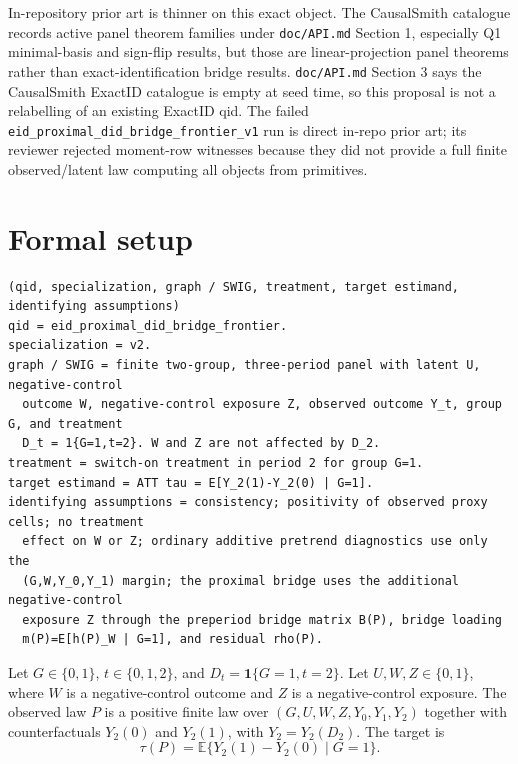 \documentclass[11pt]{article}
\newcommand{\E}{\mathbb{E}}
\newcommand{\one}{\mathbf{1}}
\theoremstyle{definition}
\theoremstyle{plain}
\theoremstyle{remark}
\begin{document}
In-repository prior art is thinner on this exact object. The CausalSmith catalogue records active panel theorem families under \texttt{doc/API.md} Section 1, especially Q1 minimal-basis and sign-flip results, but those are linear-projection panel theorems rather than exact-identification bridge results. \texttt{doc/API.md} Section 3 says the CausalSmith ExactID catalogue is empty at seed time, so this proposal is not a relabelling of an existing ExactID qid. The failed \texttt{eid\_proximal\_did\_bridge\_frontier\_v1} run is direct in-repo prior art; its reviewer rejected moment-row witnesses because they did not provide a full finite observed/latent law computing all objects from primitives.

\section{Formal setup}
\begin{verbatim}
(qid, specialization, graph / SWIG, treatment, target estimand, identifying assumptions)
qid = eid_proximal_did_bridge_frontier.
specialization = v2.
graph / SWIG = finite two-group, three-period panel with latent U, negative-control
  outcome W, negative-control exposure Z, observed outcome Y_t, group G, and treatment
  D_t = 1{G=1,t=2}. W and Z are not affected by D_2.
treatment = switch-on treatment in period 2 for group G=1.
target estimand = ATT tau = E[Y_2(1)-Y_2(0) | G=1].
identifying assumptions = consistency; positivity of observed proxy cells; no treatment
  effect on W or Z; ordinary additive pretrend diagnostics use only the
  (G,W,Y_0,Y_1) margin; the proximal bridge uses the additional negative-control
  exposure Z through the preperiod bridge matrix B(P), bridge loading
  m(P)=E[h(P)_W | G=1], and residual rho(P).
\end{verbatim}

Let \(G\in\{0,1\}\), \(t\in\{0,1,2\}\), and \(D_t=\one\{G=1,t=2\}\). Let \(U,W,Z\in\{0,1\}\), where \(W\) is a negative-control outcome and \(Z\) is a negative-control exposure. The observed law \(P\) is a positive finite law over \((G,U,W,Z,Y_0,Y_1,Y_2)\) together with counterfactuals \(Y_2(0)\) and \(Y_2(1)\), with \(Y_2=Y_2(D_2)\). The target is
\[
  \tau(P)=\E\{Y_2(1)-Y_2(0)\mid G=1\}.
\]
\end{document}
